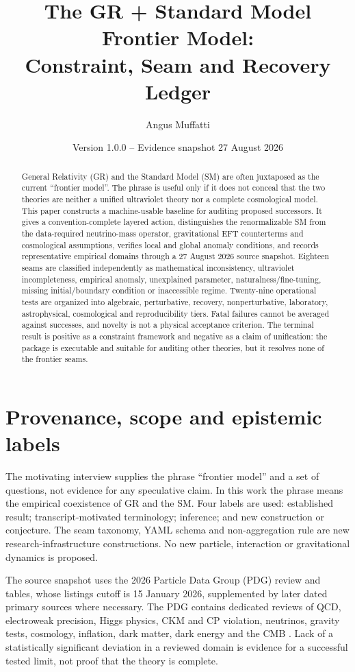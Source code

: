\documentclass[11pt,a4paper]{article}
\title{The GR + Standard Model Frontier Model:\\Constraint, Seam and Recovery Ledger}
\author{Angus Muffatti}
\date{Version 1.0.0 -- Evidence snapshot 27 August 2026}
\begin{document}
\sloppy
\maketitle

\begin{abstract}
General Relativity (GR) and the Standard Model (SM) are often juxtaposed as the current ``frontier model''. The phrase is useful only if it does not conceal that the two theories are neither a unified ultraviolet theory nor a complete cosmological model. This paper constructs a machine-usable baseline for auditing proposed successors. It gives a convention-complete layered action, distinguishes the renormalizable SM from the data-required neutrino-mass operator, gravitational EFT counterterms and cosmological assumptions, verifies local and global anomaly conditions, and records representative empirical domains through a 27 August 2026 source snapshot. Eighteen seams are classified independently as mathematical inconsistency, ultraviolet incompleteness, empirical anomaly, unexplained parameter, naturalness/fine-tuning, missing initial/boundary condition or inaccessible regime. Twenty-nine operational tests are organized into algebraic, perturbative, recovery, nonperturbative, laboratory, astrophysical, cosmological and reproducibility tiers. Fatal failures cannot be averaged against successes, and novelty is not a physical acceptance criterion. The terminal result is positive as a constraint framework and negative as a claim of unification: the package is executable and suitable for auditing other theories, but it resolves none of the frontier seams.
\end{abstract}

\tableofcontents

\section{Provenance, scope and epistemic labels}
The motivating interview supplies the phrase ``frontier model'' and a set of questions, not evidence for any speculative claim. In this work the phrase means the empirical coexistence of GR and the SM. Four labels are used: established result; transcript-motivated terminology; inference; and new construction or conjecture. The seam taxonomy, YAML schema and non-aggregation rule are new research-infrastructure constructions. No new particle, interaction or gravitational dynamics is proposed.

The source snapshot uses the 2026 Particle Data Group (PDG) review and tables, whose listings cutoff is 15 January 2026, supplemented by later dated primary sources where necessary. The PDG contains dedicated reviews of QCD, electroweak precision, Higgs physics, CKM and CP violation, neutrinos, gravity tests, cosmology, inflation, dark matter, dark energy and the CMB \cite{PDG2026}. Lack of a statistically significant deviation in a reviewed domain is evidence for a successful tested limit, not proof that the theory is complete.
\end{document}
